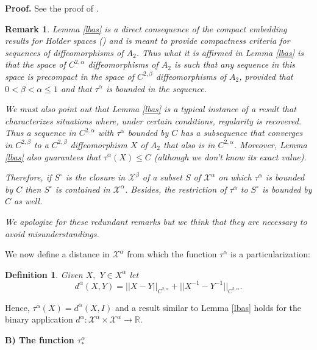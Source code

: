 \documentclass{article}
\def\proof{\noindent \bf Proof. \rm}
\newtheorem{definition}{Definition}[section]
\newtheorem{remark}{Remark}[section]
\begin{document}
\noindent
{\proof} 
See the proof of \cite[Lemma 4.2]{p1}.

\begin{remark}\label{resc}
Lemma \ref{lbas} is a direct consequence of the compact embedding results  for Holder spaces (\cite[Th. 3.1]{ad}) and is meant to provide compactness criteria  for sequences of diffeomorphisms of $A_2$. Thus what it is affirmed  in Lemma \ref{lbas} is that the space of $C^{2,\alpha}$ diffeomorphisms of $A_2$ is such that any sequence in this space is precompact in the space of $C^{2,\beta}$ diffeomorphisms of $A_2$, provided that $0<\beta<\alpha\leq 1$ and that $\tau^\alpha$ is bounded in the sequence. 

We must also point out that Lemma \ref{lbas}  is a typical instance of a result that characterizes situations where, under certain conditions, regularity is recovered. Thus a sequence in $C^{2,\alpha}$ with $\tau^\alpha$ bounded by $C$ has a subsequence that converges in $C^{2,\beta}$ to a $C^{2,\beta}$ diffeomorphism  $X$ of $A_2$ that also is in $C^{2,\alpha}$. Moreover, Lemma \ref{lbas} also guarantees that  $\tau^\alpha(X)\leq C$ (although we don't know its exact value).  

Therefore, if $S^\circ$ is the closure in $\mathcal{X}^\beta$ of a subset $S$ of $\mathcal{X}^\alpha$ on which $\tau^\alpha$ is bounded by $C$  then $S^\circ$ is contained in $\mathcal{X}^\alpha$. Besides, the restriction of $\tau^\alpha$ to $S^\circ$ is bounded by $C$ as well. 

We apologize for these redundant remarks but we  think that they are necessary to avoid misunderstandings.
\end{remark}



We now define a distance in $\mathcal X^\alpha$ from  which the function $\tau^\alpha$ is a  particularization:

\begin{definition}\label{ddist} Given $X,$ $Y\in X^\alpha$ let 
$$d^{\alpha}(X,Y)=||X-Y||_{C^{2,\alpha}}+||X^{-1}-Y^{-1}||_{C^{2,\alpha}}.$$
\end{definition}
Hence, $\tau^\alpha(X)=d^\alpha(X,I)$ and a  result similar to Lemma \ref{lbas} holds for the binary application $d^\alpha :\mathcal X^\alpha\times \mathcal X^\alpha \to \mathbb R$. 

\vspace{.3in}

\noindent
{\bf B) The function $\tau^\alpha_*$}
\end{document}
